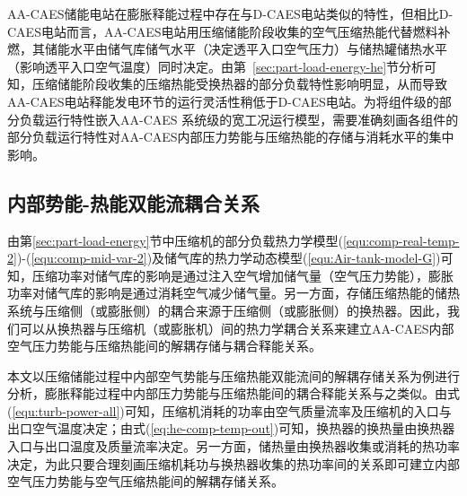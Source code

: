 AA-CAES储能电站在膨胀释能过程中存在与D-CAES电站类似的特性，但相比D-CAES电站而言，AA-CAES电站用压缩储能阶段收集的空气压缩热能代替燃料补燃，其储能水平由储气库储气水平（决定透平入口空气压力）与储热罐储热水平（影响透平入口空气温度）同时决定。由第~\ref{sec:part-load-energy-he}节分析可知，压缩储能阶段收集的压缩热能受换热器的部分负载特性影响明显，从而导致AA-CAES电站释能发电环节的运行灵活性稍低于D-CAES电站。为将组件级的部分负载运行特性嵌入AA-CAES 系统级的宽工况运行模型，需要准确刻画各组件的部分负载运行特性对AA-CAES内部压力势能与压缩热能的存储与消耗水平的集中影响。

\subsection{内部势能-热能双能流耦合关系}
由第\ref{sec:part-load-energy}节中压缩机的部分负载热力学模型(\ref{equ:comp-real-temp-2})-(\ref{equ:comp-mid-var-2})及储气库的热力学动态模型(\ref{equ:Air-tank-model-G})可知，压缩功率对储气库的影响是通过注入空气增加储气量（空气压力势能），膨胀功率对储气库的影响是通过消耗空气减少储气量。另一方面，存储压缩热能的储热系统与压缩侧（或膨胀侧）的耦合来源于压缩侧（或膨胀侧）的换热器。因此，我们可以从换热器与压缩机（或膨胀机）间的热力学耦合关系来建立AA-CAES内部空气压力势能与压缩热能间的解耦存储与耦合释能关系。

本文以压缩储能过程中内部空气势能与压缩热能双能流间的解耦存储关系为例进行分析，膨胀释能过程中内部压力势能与压缩热能间的耦合释能关系与之类似。由式(\ref{equ:turb-power-all})可知，压缩机消耗的功率由空气质量流率及压缩机的入口与出口空气温度决定；由式(\ref{eq:he-comp-temp-out})可知，换热器的换热量由换热器入口与出口温度及质量流率决定。另一方面，储热量由换热器收集或消耗的热功率决定，为此只要合理刻画压缩机耗功与换热器收集的热功率间的关系即可建立内部空气压力势能与空气压缩热能间的解耦存储关系。

